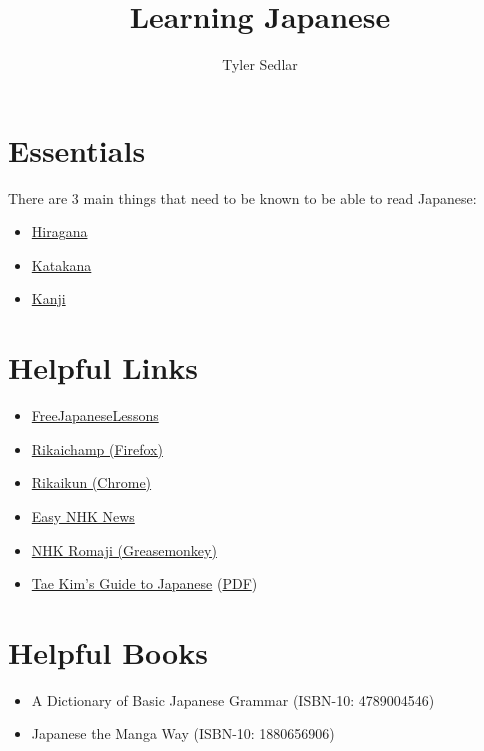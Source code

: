 \documentclass{article}
\begin{document}
\title{Learning Japanese}
\author{Tyler Sedlar}

\maketitle

\section*{Essentials}

There are 3 main things that need to be known to be able to read Japanese:

\begin{itemize}
\item \hyperref[sec:hiragana]{Hiragana}
\item \hyperref[sec:katakana]{Katakana}
\item \hyperref[sec:kanji]{Kanji}
\end{itemize}

\section*{Helpful Links}

\begin{itemize}
\item \href{https://www.freejapaneselessons.com/}{FreeJapaneseLessons}
\item \href{https://addons.mozilla.org/en-US/firefox/addon/rikaichamp/}{Rikaichamp (Firefox)}
\item \href{https://chrome.google.com/webstore/detail/rikaikun/jipdnfibhldikgcjhfnomkfpcebammhp?hl=en}{Rikaikun (Chrome)}
\item \href{https://www3.nhk.or.jp/news/easy/}{Easy NHK News}
\item \href{https://gist.github.com/TSedlar/ee614e00f90ad1d5069cb0416cf59a65}{NHK Romaji (Greasemonkey)}
\item \href{http://www.guidetojapanese.org/learn/}{Tae Kim's Guide to Japanese} (\href{http://www.guidetojapanese.org/grammar_guide.pdf}{PDF})
\end{itemize}

\section*{Helpful Books}
\begin{itemize}
\item A Dictionary of Basic Japanese Grammar (ISBN-10: 4789004546)
\item Japanese the Manga Way (ISBN-10: 1880656906)
\end{itemize}
\end{document}
